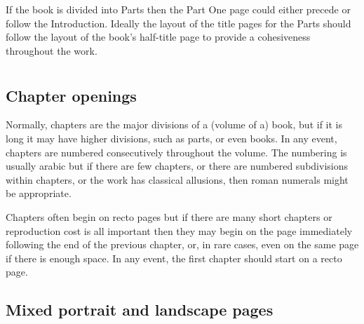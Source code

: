 \documentclass[10pt,a4paper,extrafontsizes]{memoir}
\begin{document}
\begin{paracol}{2}
\switchEng
    If the book is divided into Parts then the Part One 
page could either precede or follow the 
Introduction. Ideally the layout of the title pages for the Parts should
follow the layout of the book's half-title page 
to provide a cohesiveness throughout the work.
\end{paracol}

\section{\prMainmatter}

\subsection{Chapter openings}

\begin{paracol}{2}
\switchEng
    Normally, chapters are the major divisions of a (volume of a) book, 
but if it is long
it may have higher divisions, such as parts, or even books. In any event,
chapters are numbered consecutively throughout the volume. The numbering
is usually arabic but if there are few chapters, or there are numbered
subdivisions within chapters, or the work has classical allusions, then
roman numerals might be appropriate.

    Chapters often begin on recto pages but if there are many short chapters
or reproduction cost is all important then they may begin on the page
immediately following the end of the previous chapter, or, in rare cases,
even on the same page if there is enough space. In any event, the first chapter
should start on a recto page.
\end{paracol}

\subsection{Mixed portrait and landscape pages}
\end{document}
